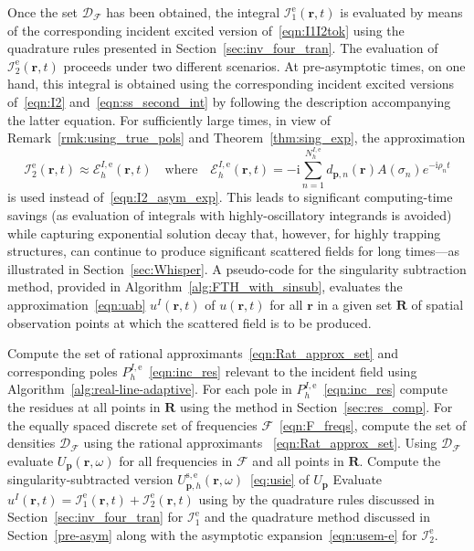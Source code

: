 \documentclass[11pt]{article}
\theoremstyle{plain}
\theoremstyle{remark}
\def \br{\mathbf{r}}
\def \bp{\mathbf{p}}
\begin{document}
Once the set $\mathcal{D}_\mathcal{F}$ has been obtained, the integral
$\mathcal{I}^\mathrm{e}_{1}(\br,t)$ is evaluated by means of the
corresponding incident excited version of~\eqref{eqn:I1I2tok} using
the quadrature rules presented in Section~\ref{sec:inv_four_tran}. The
evaluation of $\mathcal{I}_2^\mathrm{e}(\br,t)$ proceeds under two
different scenarios. At pre-asymptotic times, on one hand, this
integral is obtained using the corresponding incident excited versions
of~\eqref{eqn:I2} and~\eqref{eqn:ss_second_int} by following the
description accompanying the latter equation. For sufficiently large
times, in view of Remark~\ref{rmk:using_true_pols} and
Theorem~\ref{thm:sing_exp}, the approximation
\begin{equation}\label{eqn:usem-e}
    \mathcal{I}_2^\mathrm{e}(\br,t) \approx \mathcal{E}^{I,\mathrm{e}}_h(\br,t) \quad \text{where} \quad \mathcal{E}^{I,\mathrm{e}}_h(\br,t) =  -\mathrm{i}\sum_{n = 1}^{N_h^{I,\mathrm{e}}} d_{\bp,n}(\br) A(\sigma_n)e^{-\mathrm{i}\rho_nt}
\end{equation}
is used instead of~\eqref{eqn:I2_asym_exp}. This leads to significant
computing-time savings (as evaluation of integrals with
highly-oscillatory integrands is avoided) while capturing exponential
solution decay that, however, for highly trapping structures, can
continue to produce significant scattered fields for long times---as
illustrated in Section~\ref{sec:Whisper}. A pseudo-code for the
singularity subtraction method, provided in
Algorithm~\ref{alg:FTH_with_sinsub}, evaluates the
approximation~\eqref{eqn:uab} $u^I(\br,t)$ of $u(\br,t)$ for all $\br$
in a given set $\mathbf{R}$ of spatial observation points at which the
scattered field is to be produced.

\vspace{0.3cm}
\begin{algorithm}
\DontPrintSemicolon 
Compute the set of rational approximants~\eqref{eqn:Rat_approx_set} and corresponding poles $P_h^{I,\mathrm{e}}$~\eqref{eqn:inc_res} relevant to the incident field using Algorithm~\ref{alg:real-line-adaptive}.\;
For each pole in $P_{h}^{I,\mathrm{e}}$~\eqref{eqn:inc_res} compute the residues at all points in $\mathbf{R}$  using the method in Section~\ref{sec:res_comp}.\;
For the equally spaced discrete set of frequencies $\mathcal{F}$~\eqref{eqn:F_freqs}, compute the set of densities $\mathcal{D}_\mathcal{F}$ using the rational approximants ~\eqref{eqn:Rat_approx_set}.\;
Using $\mathcal{D}_\mathcal{F}$ evaluate $U_{\bp}(\br,\omega)$ for all frequencies in $\mathcal{F}$ and all points in $\mathbf{R}$.\;
Compute the singularity-subtracted version
$U_{\bp,h}^\mathrm{s,e}(\br,\omega)$~\eqref{eq:usie} of $U_\bp$ \;
Evaluate $u^I(\br,t) = \mathcal{I}^\mathrm{e}_1(\br,t) + \mathcal{I}^\mathrm{e}_2(\br,t)$ using by the quadrature rules discussed in Section~\ref{sec:inv_four_tran} for $\mathcal{I}^\mathrm{e}_1$ and the quadrature method discussed in Section~\ref{pre-asym} along with the asymptotic expansion~\eqref{eqn:usem-e} for $\mathcal{I}^\mathrm{e}_2$.
\caption{Singularity subtraction-enabled FTH
algorithm (FTH-SS)} \label{alg:FTH_with_sinsub}
\end{algorithm}
\vspace{0.3cm}
\end{document}
